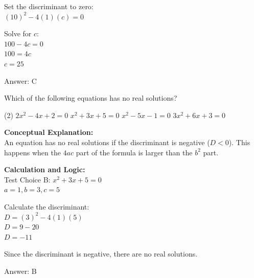 \documentclass[11pt,paper=a4,answers]{exam}
\begin{document}
\begin{questions}
\begin{solution}
\vspace{10pt}

Set the discriminant to zero: \\
$(10)^2 - 4(1)(c) = 0$

\vspace{10pt}

Solve for $c$: \\
$100 - 4c = 0$ \\
$100 = 4c$ \\
$c = 25$

\vspace{25pt}

Answer: \colorbox{yellow!100}{C}
\end{solution}

\vspace{40pt}

\question
Which of the following equations has no real solutions?
\begin{tasks}(2)
    \task $2x^2 - 4x + 2 = 0$
    \task $x^2 + 3x + 5 = 0$
    \task $x^2 - 5x - 1 = 0$
    \task $3x^2 + 6x + 3 = 0$
\end{tasks}

\begin{solution}
\textbf{Conceptual Explanation:} \\
An equation has no real solutions if the discriminant is negative ($D < 0$). This happens when the $4ac$ part of the formula is larger than the $b^2$ part.

\vspace{20pt}

\textbf{Calculation and Logic:} \\
Test Choice B: $x^2 + 3x + 5 = 0$ \\
$a = 1, b = 3, c = 5$

\vspace{10pt}

Calculate the discriminant: \\
$D = (3)^2 - 4(1)(5)$ \\
$D = 9 - 20$ \\
$D = -11$

\vspace{10pt}

Since the discriminant is negative, there are no real solutions.

\vspace{25pt}

Answer: \colorbox{yellow!100}{B}
\end{solution}


\end{questions}
\end{document}
